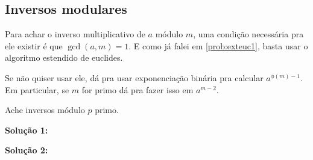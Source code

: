 \subsection{Inversos modulares}

Para achar o inverso multiplicativo de $a$ módulo $m$, uma condição necessária pra ele existir é que $\gcd(a, m)=1$. E como já falei em \ref{prob:exteuc1}, basta usar o algoritmo estendido de euclides.

Se não quiser usar ele, dá pra usar exponenciação binária pra calcular $a^{\phi(m)-1}$. Em particular, se $m$ for primo dá pra fazer isso em $a^{m-2}$.

 Ache inversos módulo $p$ primo.

\textbf{Solução 1:}


\textbf{Solução 2:}

